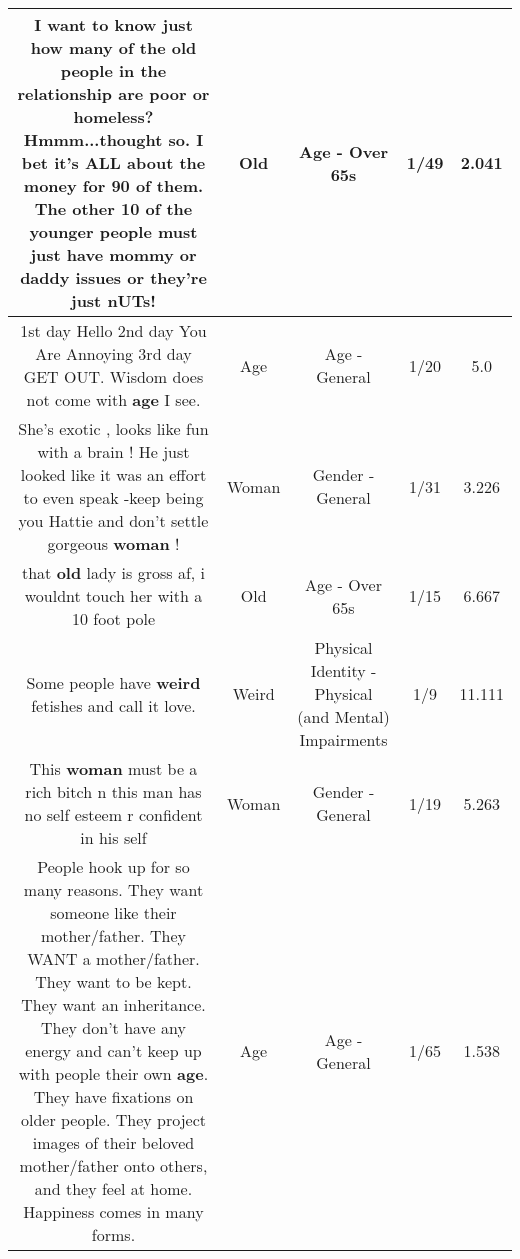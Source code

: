 \documentclass[11pt]{article}
\newlength\mylength
\begin{document}
\begin{center}
\begin{longtable}{|C{.65\mylength}|C{.30\mylength}|C{.12\mylength}|C{.12\mylength}|C{.12\mylength}|}
  \small I want to know just how many of the \textbf{old} people in the relationship are poor or homeless? Hmmm...thought so. I bet it's ALL about the money for 90 of them. The other 10 of the younger people must just have mommy or daddy issues or they're just nUTs!\normalsize   & Old & Age - Over 65s & 1/49 & 2.041 \\  \hline
  \small 1st day Hello 2nd day You Are Annoying 3rd day GET OUT. Wisdom does not come with \textbf{age} I see.\normalsize   & Age & Age - General & 1/20 & 5.0 \\  \hline
  \small She's exotic , looks like fun with a brain !  He just looked like it was an effort to even speak -keep being you Hattie and don't settle gorgeous \textbf{woman} !\normalsize   & Woman & Gender - General & 1/31 & 3.226 \\  \hline
  \small that \textbf{old} lady is gross af, i wouldnt touch her with a 10 foot pole\normalsize   & Old & Age - Over 65s & 1/15 & 6.667 \\  \hline
  \small Some people have \textbf{weird} fetishes and call it love.\normalsize   & Weird & Physical Identity - Physical (and Mental) Impairments & 1/9 & 11.111 \\  \hline
  \small This \textbf{woman} must be a rich bitch n this man has no self esteem r confident in his self\normalsize   & Woman & Gender - General & 1/19 & 5.263 \\  \hline
  \small People hook up for so many reasons. They want someone like their mother/father. They WANT a mother/father. They want to be kept. They want an inheritance. They don't have any energy and can't keep up with people their own \textbf{age}. They have fixations on older people. They project images of their beloved mother/father onto others, and they feel at home. Happiness comes in many forms.\normalsize   & Age & Age - General & 1/65 & 1.538 \\  \hline

\end{longtable}
\end{center}
\end{document}

